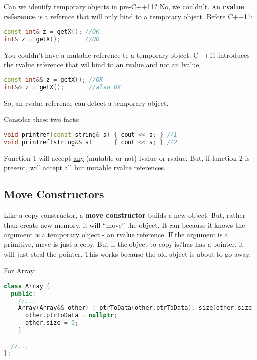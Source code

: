 Can we identify temporary objects in pre-C++11? No, we couldn't. An \textbf{rvalue reference} is a refernce that will only bind to a temporary object. Before C++11:

\begin{lstlisting}[language=C++]
const int& z = getX(); //OK
int& z = getX();       //NO
\end{lstlisting}

You couldn't have a mutable reference to a temporary object. C++11 introduces the rvalue reference that wil bind to an rvalue and \underline{not} an lvalue.

\begin{lstlisting}[language=C++]
const int&& z = getX(); //OK
int&& z = getX();       //also OK
\end{lstlisting}

So, an rvalue reference can detect a temporary object. 

Consider these two facts:

\begin{lstlisting}[language=C++]
void printref(const string& s) { cout << s; } //1
void printref(string&& s)      { cout << s; } //2
\end{lstlisting}

Function 1 will accept \underline{any} (mutable or not) lvalue or rvalue. But, if function 2 is present, will accept \underline{all but} mutable rvalue references.


\subsection{Move Constructors}

Like a copy constructor, a \textbf{move constructor} builds a new object. But, rather than create new memory, it will ``move'' the object. It can because it knows the argument is a temporary object - an rvalue reference. If the argument is a primitive, move is just a copy. But if the object to copy is/has  has a pointer, it will just steal the pointer. This works because the old object is about to go away.

For Array:

\begin{lstlisting}[language=C++]
class Array {
  public:
    //...
    Array(Array&& other) : ptrToData(other.ptrToData), size(other.size) {
      other.ptrToData = nullptr;
      other.size = 0;
    }

  //...
};
\end{lstlisting}

